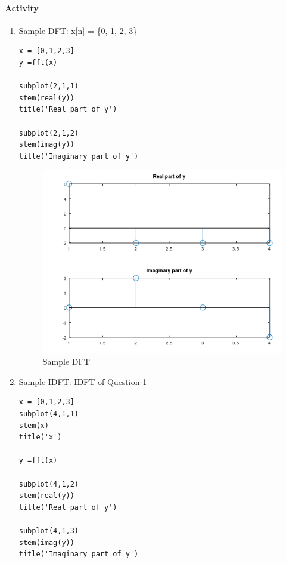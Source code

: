 \documentclass[12pt]{article}
\begin{document}
\paragraph{Activity}
\begin{enumerate}
    \item Sample DFT: x[n] = \{0, 1, 2, 3\}
    \begin{Verbatim}[frame = single]
x = [0,1,2,3]
y =fft(x)

subplot(2,1,1)
stem(real(y))
title('Real part of y')

subplot(2,1,2)
stem(imag(y))
title('Imaginary part of y')  
    \end{Verbatim}
    \begin{figure}[h!]
        \centering
        \includegraphics{labss/Lab4_1.PNG}
        \caption{Sample DFT}
    \end{figure}
    \item Sample IDFT: IDFT of Question 1
    \begin{Verbatim}[frame = single]
x = [0,1,2,3]
subplot(4,1,1)
stem(x)
title('x')

y =fft(x)

subplot(4,1,2)
stem(real(y))
title('Real part of y')

subplot(4,1,3)
stem(imag(y))
title('Imaginary part of y')


\end{Verbatim}
\end{enumerate}
\end{document}
